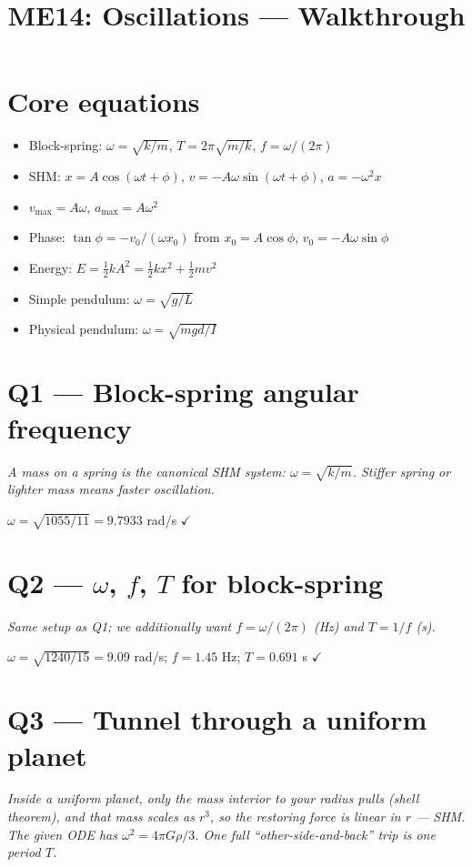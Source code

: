 \documentclass[11pt]{article}
\title{ME14: Oscillations --- Walkthrough}
\author{}\date{}
\newcommand{\checkmk}{\ensuremath{\checkmark}}
\begin{document}
\maketitle

\section*{Core equations}
\begin{itemize}[leftmargin=*]
\item Block-spring: $\omega = \sqrt{k/m}$, $T = 2\pi\sqrt{m/k}$, $f=\omega/(2\pi)$
\item SHM: $x = A\cos(\omega t+\phi)$, $v = -A\omega\sin(\omega t+\phi)$, $a=-\omega^2 x$
\item $v_{\max}=A\omega$, $a_{\max}=A\omega^2$
\item Phase: $\tan\phi = -v_0/(\omega x_0)$ from $x_0=A\cos\phi$, $v_0=-A\omega\sin\phi$
\item Energy: $E = \tfrac12 kA^2 = \tfrac12 kx^2 + \tfrac12 mv^2$
\item Simple pendulum: $\omega = \sqrt{g/L}$
\item Physical pendulum: $\omega = \sqrt{mgd/I}$
\end{itemize}

\section*{Q1 --- Block-spring angular frequency}
\emph{A mass on a spring is the canonical SHM system: $\omega = \sqrt{k/m}$. Stiffer spring or lighter mass means faster oscillation.}

$\omega = \sqrt{1055/11} = \boxed{9.7933}$ rad/s \checkmk

\section*{Q2 --- $\omega$, $f$, $T$ for block-spring}
\emph{Same setup as Q1; we additionally want $f = \omega/(2\pi)$ (Hz) and $T = 1/f$ (s).}

$\omega = \sqrt{1240/15} = 9.09$ rad/s; $f = 1.45$ Hz; $T = 0.691$ s \checkmk

\section*{Q3 --- Tunnel through a uniform planet}
\emph{Inside a uniform planet, only the mass interior to your radius pulls (shell theorem), and that mass scales as $r^3$, so the restoring force is linear in $r$ --- SHM. The given ODE has $\omega^2 = 4\pi G \rho/3$. One full ``other-side-and-back'' trip is one period $T$.}
\end{document}
